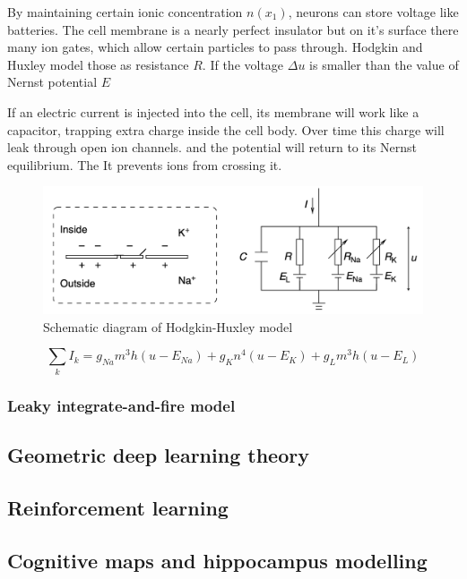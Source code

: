 \documentclass[12pt]{article}
\begin{document}
By maintaining  certain ionic concentration $n(x_1)$, neurons can store voltage like batteries. The cell membrane is a nearly perfect insulator but on it's surface there many ion gates, which allow certain particles to pass through. Hodgkin and Huxley model those as resistance $R$. If the voltage $\Delta u$ is smaller than the value of Nernst potential $E$

If an electric current is injected into the cell, its membrane will work like a capacitor, trapping extra charge inside the cell body. Over time this charge will leak through open ion channels. and the potential will return to its Nernst equilibrium.  The It prevents ions from crossing it. 

\begin{figure}[!htbp]
	\centering
	\includegraphics[width=13cm]{hodgkin_huxley_model}
	\caption{Schematic diagram of  Hodgkin-Huxley model}
	\label{fig:hodgkin_huxley_model}
\end{figure} 
  
\[
\sum_{k}I_k  = g_{Na}m^3h(u-E_{Na}) + g_{K}n^4(u-E_{K}) + g_{L}m^3h(u-E_{L})
\]

\subsubsection{Leaky integrate-and-fire model}


\subsection{Geometric deep learning theory}

\subsection{Reinforcement learning}

\subsection{Cognitive maps and hippocampus modelling}
\end{document}
